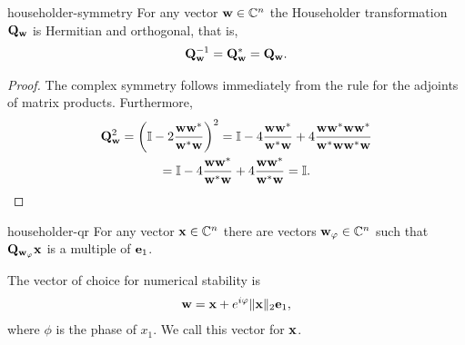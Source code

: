 \begin{Lemma}{householder-symmetry}
  For any vector $\mathbf w\in\mathbb C^n$ the Householder transformation
  $\mathbf Q_{\mathbf w}$ is Hermitian and orthogonal, that is,
  \begin{gather}
    \mathbf Q_{\mathbf w}^{-1} = \mathbf Q_{\mathbf w}^* = \mathbf Q_{\mathbf w}.
  \end{gather}
\end{Lemma}

\begin{proof}
  The complex symmetry follows immediately from the rule for the
  adjoints of matrix products. Furthermore,
  \begin{multline}
    \mathbf Q_{\mathbf w}^2 = \left(\mathbb I - 2\frac{\mathbf w\mathbf w^*}{\mathbf w^*\mathbf w}\right)^2
    = \mathbb I - 4\frac{\mathbf w\mathbf w^*}{\mathbf w^*\mathbf w} + 4\frac{\mathbf w\mathbf w^*\mathbf w\mathbf w^*}{\mathbf w^*\mathbf w\mathbf w^*\mathbf w}
    \\
    = \mathbb I - 4\frac{\mathbf w\mathbf w^*}{\mathbf w^*\mathbf w} + 4\frac{\mathbf w\mathbf w^*}{\mathbf w^*\mathbf w} = \mathbb I.
  \end{multline}
\end{proof}

\begin{Lemma}{householder-qr}
  For any vector $\mathbf x\in\mathbb C^n$ there are vectors $\mathbf w_\varphi\in\mathbb C^n$ such
  that $\mathbf Q_{\mathbf w_\varphi} \mathbf x$ is a multiple of $\mathbf e_1$.

  The vector of choice for numerical stability is
  \begin{gather}
    \label{eq:ortho:householder:1}
    \mathbf w = \mathbf x + e^{i\varphi} \lVert\mathbf x\rVert_2\mathbf e_1,
  \end{gather}
  where $\phi$ is the phase of $x_1$. We call this vector  for $\mathbf x$.
\end{Lemma}

